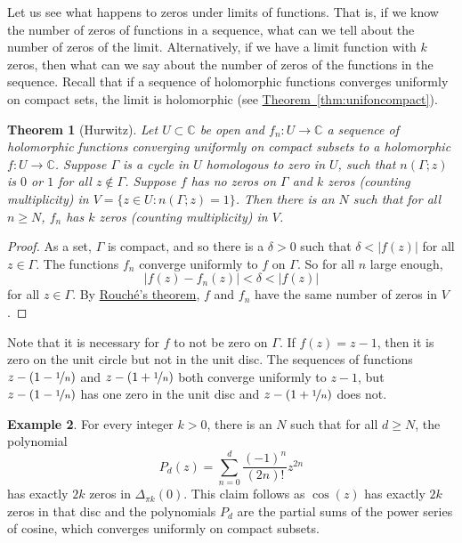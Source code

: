 \documentclass[12pt,openany]{book}
\newcommand{\sabs}[1]{\lvert {#1} \rvert}
\newcommand{\C}{{\mathbb{C}}}
\theoremstyle{plain}
\newtheorem{thm}{Theorem}[section]
\theoremstyle{remark}
\theoremstyle{definition}
\theoremstyle{exercise}
\theoremstyle{example}
\newtheorem{example}[thm]{Example}
\newcommand{\thmref}[1]{\hyperref[#1]{Theorem~\ref*{#1}}}
\begin{document}
Let us see what happens to zeros under limits of functions.
That is, if we know the number of zeros of functions in a sequence,
what can we tell about the number of zeros of the limit.  Alternatively,
if we have a limit function with $k$ zeros, then what can
we say about the number of zeros of the functions in the sequence.
Recall that if a sequence of holomorphic
functions converges uniformly on compact sets, the limit is holomorphic
(see \thmref{thm:unifoncompact}).

\begin{thm}[Hurwitz]
Let $U \subset \C$ be open and $f_n \colon U \to \C$ a sequence of
holomorphic functions converging uniformly on compact subsets
to a holomorphic $f \colon U \to \C$.  Suppose $\Gamma$ is
a cycle in $U$ homologous to zero in $U$,
such that $n(\Gamma;z)$ is $0$ or $1$ for all $z \notin \Gamma$.
Suppose $f$ has no zeros on $\Gamma$ and $k$ zeros (counting
multiplicity) in $V = \bigl\{ z \in U : n(\Gamma;z) = 1 \bigr\}$.
Then there is an $N$ such that for all $n \geq N$,
$f_n$ has $k$ zeros (counting multiplicity) in $V$.
\end{thm}

\begin{proof}
As a set, $\Gamma$ is compact, and so
there is a $\delta > 0$ such that $\delta < \sabs{f(z)}$
for all $z \in \Gamma$.
The functions $f_n$
converge uniformly to $f$ on $\Gamma$.
So for all $n$ large enough,
\begin{equation*}
\sabs{f(z)-f_n(z)} < \delta < \sabs{f(z)}
\end{equation*}
for all $z \in \Gamma$.  By \hyperref[thm:rouche2]{Rouch\'e's theorem},
$f$ and $f_n$ have the same number of zeros in $V$.
\end{proof}

Note that it is necessary for $f$
to not be zero on $\Gamma$.  If $f(z) = z-1$, then it is zero on
the unit circle but not in the unit disc.
The sequences of functions $z-(1-\nicefrac{1}{n})$ and 
$z-(1+\nicefrac{1}{n})$ both converge uniformly to $z-1$, but
$z-(1-\nicefrac{1}{n})$ has one zero in the unit disc
and $z-(1+\nicefrac{1}{n})$ does not.

\begin{example}
For every integer $k > 0$, there is an $N$ such that
for all $d \geq N$,
the polynomial
\begin{equation*}
P_d(z) = \sum_{n=0}^d \frac{{(-1)}^n}{(2n)!}z^{2n}
\end{equation*}
has exactly $2k$ zeros in $\Delta_{\pi k}(0)$.
This claim follows as $\cos(z)$ has exactly $2k$ zeros in that disc
and the polynomials $P_d$ are the partial sums of the power series of
cosine, which converges uniformly on compact subsets.
\end{example}
  
\end{document}
